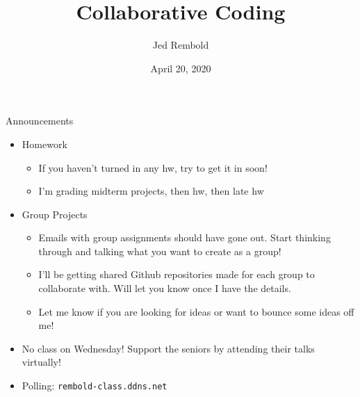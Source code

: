 \documentclass[pdf, aspectratio=169, 12pt]{beamer}
\title{Collaborative Coding}
\author{Jed Rembold}
\date{April 20, 2020}
\begin{document}
\begin{frame}{Announcements}
	\begin{itemize}
		\item Homework
			\begin{itemize}
				\item If you haven't turned in any hw, try to get it in soon!
				\item I'm grading midterm projects, then hw, then late hw
			\end{itemize}
		\item Group Projects
			\begin{itemize}
				\item Emails with group assignments should have gone out. Start thinking through and talking what you want to create as a group!
				\item I'll be getting shared Github repositories made for each group to collaborate with. Will let you know once I have the details.
				\item Let me know if you are looking for ideas or want to bounce some ideas off me!
			\end{itemize}
		\item No class on Wednesday! Support the seniors by attending their talks virtually!
		\item Polling: \nolinkurl{rembold-class.ddns.net}
	\end{itemize}
\end{frame}
\end{document}
